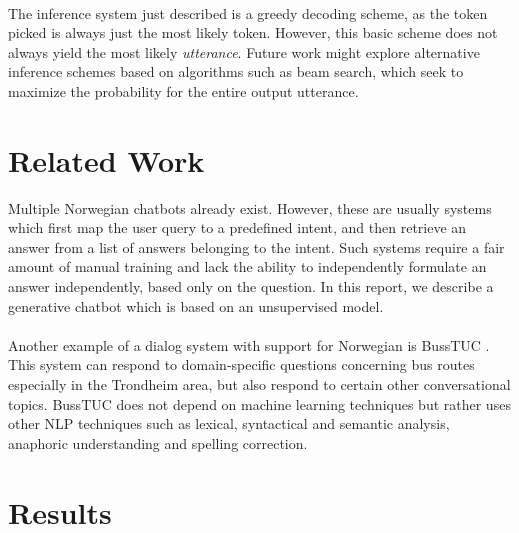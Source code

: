 \documentclass{article}
\begin{document}
\paragraph{}
The inference system just described is a greedy decoding scheme, as the token
picked is always just the most likely token. However, this basic scheme does
not always yield the most likely \emph{utterance}. Future work might explore
alternative inference schemes based on algorithms such as beam search, which
seek to maximize the probability for the entire output utterance.


\section*{Related Work}
Multiple Norwegian chatbots already exist. However, these are usually systems
which first map the user query to a predefined intent, and then retrieve an
answer from a list of answers belonging to the intent. Such systems require a
fair amount of manual training and lack the ability to independently formulate
an answer independently, based only on the question. In this report, we
describe a generative chatbot which is based on an unsupervised model.

\paragraph{}
Another example of a dialog system with support for Norwegian is BussTUC
\cite{buss-tuc}. This system can respond to domain-specific questions
concerning bus routes especially in the Trondheim area, but also respond to
certain other conversational topics. BussTUC does not depend on machine
learning techniques but rather uses other NLP techniques such as lexical,
syntactical and semantic analysis, anaphoric understanding and spelling
correction.

\section*{Results}
\end{document}
